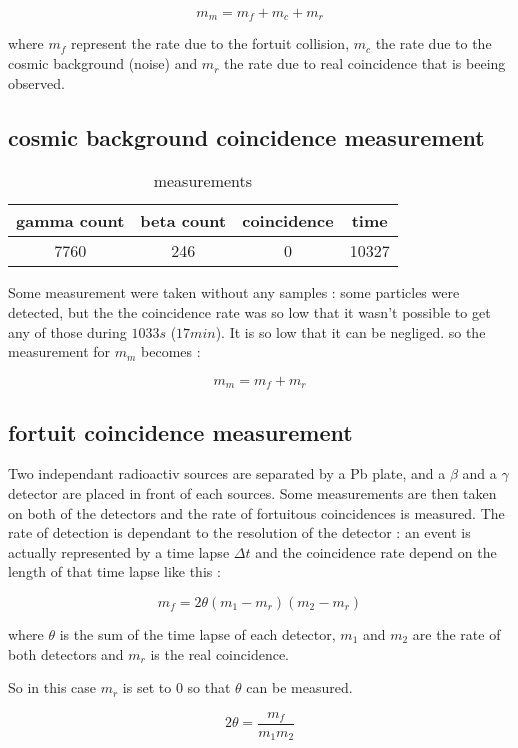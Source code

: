 \documentclass[a4paper,12pt,oneside]{article}
\def \be {\begin{equation}}
\def \ee {\end{equation}}
\begin{document}
\be 
	m_m = m_f + m_c + m_r
\ee 

where $m_f$ represent the rate due to the fortuit collision, $m_c$ the rate due to the cosmic background (noise) and $m_r$ the rate due to real coincidence that is beeing observed. 

\subsection{cosmic background coincidence measurement}


\begin{table}[h!]
\centering
	\begin{tabular}{|c|c|c|c|}
		\hline
			gamma count		&beta count		&coincidence	&time\\
		\hline
			7760			&246			&0				&10327\\
		\hline
	\end{tabular}
	\caption{measurements}
	\label{tab:poisson}
\end{table}


Some measurement were taken without any samples : some particles were detected, but the the coincidence rate was so low that it wasn't possible to get any of those during $1033 s$ ($17 min$). It is so low that it can be negliged. so the measurement for $m_m$ becomes :

\be 
	m_m = m_f + m_r
\ee 

\subsection{fortuit coincidence measurement}

Two independant radioactiv sources are separated by a Pb plate, and a $\beta$ and a $\gamma$ detector are placed in front of each sources. Some measurements are then taken on both of the detectors and the rate of fortuitous coincidences is measured. The rate of detection is dependant to the resolution of the detector : an event is actually represented by a time lapse $\Delta t$ and the coincidence rate depend on the length of that time lapse like this :

\be
	m_f = 2\theta (m_1-m_r) (m_2-m_r)
\ee

where $\theta$ is the sum of the time lapse of each detector, $m_1$ and $m_2$ are the rate of both detectors and $m_r$ is the real coincidence. 

So in this case $m_r$ is set to $0$ so that $\theta$ can be measured.

\be
	2\theta = \frac{m_f}{m_1 m_2}
\ee
\end{document}
